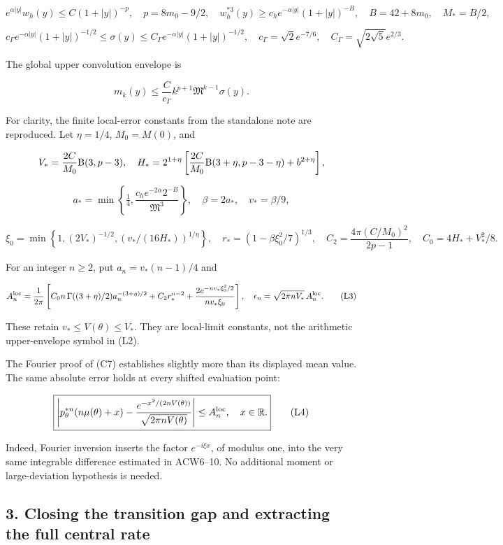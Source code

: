\[
e^{\alpha|y|}w_h(y)\le C(1+|y|)^{-p},\quad
p=8m_0-9/2,\quad
w_h^{*3}(y)\ge c_h e^{-\alpha|y|}(1+|y|)^{-B},
\quad B=42+8m_0,\quad M_*=B/2,
\tag{L1}
\]

\[
c_\Gamma e^{-\alpha|y|}(1+|y|)^{-1/2}\le\sigma(y)
\le C_\Gamma e^{-\alpha|y|}(1+|y|)^{-1/2},
\quad c_\Gamma=\sqrt2e^{-7/6},\quad C_\Gamma=\sqrt{2\sqrt5}e^{2/3}.
\]

The global upper convolution envelope is

\[
m_k(y)\le\frac C{c_\Gamma}k^{p+1}\mathfrak M^{k-1}\sigma(y).
\tag{L2}
\]

For clarity, the finite local-error constants from the standalone note are reproduced. Let \(\eta=1/4\), \(M_0=M(0)\), and

\[
V_* =\frac{2C}{M_0}{\rm B}(3,p-3),\quad
H_* =2^{1+\eta}\left[\frac{2C}{M_0}{\rm B}(3+\eta,p-3-\eta)+b^{2+\eta}\right],
\]

\[
a_* =\min\left\{\tfrac14,\frac{c_he^{-2\alpha}2^{-B}}{\mathfrak M^3}\right\},
\quad\beta=2a_*,\quad v_*=\beta/9,
\]

\[
\xi_0=\min\left\{1,(2V_*)^{-1/2},
(v_*/(16H_*))^{1/\eta}\right\},\quad
r_*=(1-\beta\xi_0^2/7)^{1/3},\quad
C_2=\frac{4\pi(C/M_0)^2}{2p-1},\quad C_0=4H_*+V_*^2/8.
\]

For an integer \(n\ge2\), put \(a_n=v_*(n-1)/4\) and

\[
A_n^{\rm loc}=\frac1{2\pi}\left[
C_0n\,\Gamma((3+\eta)/2)a_n^{-(3+\eta)/2}
+C_2r_*^{n-2}+
\frac{2e^{-nv_*\xi_0^2/2}}{nv_*\xi_0}\right],
\quad\epsilon_n=\sqrt{2\pi nV_*}\,A_n^{\rm loc}.
\tag{L3}
\]

These retain \(v_*\le V(\theta)\le V_*\). They are local-limit constants, not the arithmetic upper-envelope symbol in (L2).

The Fourier proof of (C7) establishes slightly more than its displayed mean value. The same absolute error holds at every shifted evaluation point:

\[
\boxed{\left|p_\theta^{*n}(n\mu(\theta)+x)
-\frac{e^{-x^2/(2nV(\theta))}}{\sqrt{2\pi nV(\theta)}}\right|
\le A_n^{\rm loc},\quad x\in\mathbb R.}
\tag{L4}
\]

Indeed, Fourier inversion inserts the factor \(e^{-i\xi x}\), of modulus one, into the very same integrable difference estimated in ACW6--10. No additional moment or large-deviation hypothesis is needed.

\subsection{3. Closing the transition gap and extracting the full central rate}\label{closing-the-transition-gap-and-extracting-the-full-central-rate}

